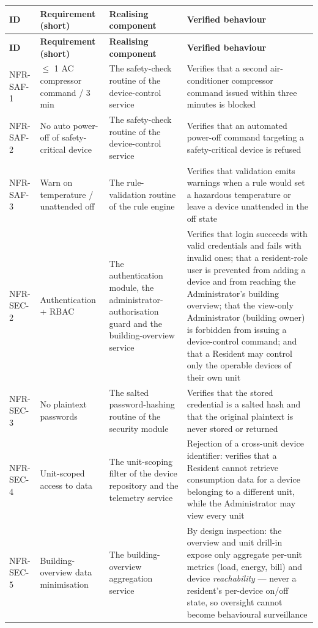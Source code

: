 \begin{longtable}{@{}L{1.7cm} L{4.3cm} L{4.4cm} L{3.4cm}@{}}
\toprule
\textbf{ID} & \textbf{Requirement (short)} & \textbf{Realising component} & \textbf{Verified behaviour} \\
\midrule
\endfirsthead
\toprule
\textbf{ID} & \textbf{Requirement (short)} & \textbf{Realising component} & \textbf{Verified behaviour} \\
\midrule
\endhead
\bottomrule
\endfoot
NFR-SAF-1 & $\le$ 1 AC compressor command / 3 min & The safety-check routine of the device-control service & Verifies that a second air-conditioner compressor command issued within three minutes is blocked \\
NFR-SAF-2 & No auto power-off of safety-critical device & The safety-check routine of the device-control service & Verifies that an automated power-off command targeting a safety-critical device is refused \\
NFR-SAF-3 & Warn on temperature / unattended off & The rule-validation routine of the rule engine & Verifies that validation emits warnings when a rule would set a hazardous temperature or leave a device unattended in the off state \\
NFR-SEC-2 & Authentication + RBAC & The authentication module, the administrator-authorisation guard and the building-overview service & Verifies that login succeeds with valid credentials and fails with invalid ones; that a resident-role user is prevented from adding a device and from reaching the Administrator's building overview; that the view-only Administrator (building owner) is forbidden from issuing a device-control command; and that a Resident may control only the operable devices of their own unit \\
NFR-SEC-3 & No plaintext passwords & The salted password-hashing routine of the security module & Verifies that the stored credential is a salted hash and that the original plaintext is never stored or returned \\
NFR-SEC-4 & Unit-scoped access to data & The unit-scoping filter of the device repository and the telemetry service & Rejection of a cross-unit device identifier: verifies that a Resident cannot retrieve consumption data for a device belonging to a different unit, while the Administrator may view every unit \\
NFR-SEC-5 & Building-overview data minimisation & The building-overview aggregation service & By design inspection: the overview and unit drill-in expose only aggregate per-unit metrics (load, energy, bill) and device \emph{reachability} --- never a resident's per-device on/off state, so oversight cannot become behavioural surveillance \\

\end{longtable}
